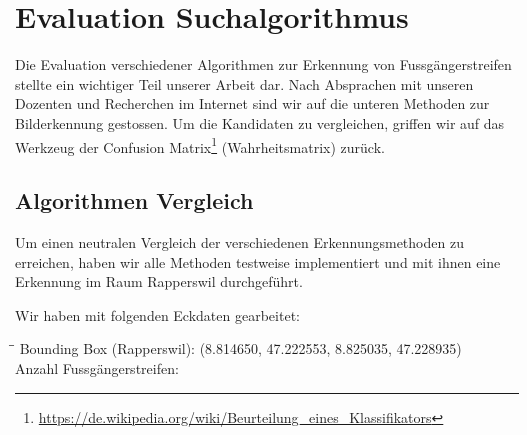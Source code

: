 \section{Evaluation Suchalgorithmus}
\label{sec:suchalgorithmus}
Die Evaluation verschiedener Algorithmen zur Erkennung von Fussgängerstreifen stellte ein wichtiger Teil unserer Arbeit dar. Nach Absprachen mit unseren Dozenten und Recherchen im Internet sind wir auf die unteren Methoden zur Bilderkennung gestossen. Um die Kandidaten zu vergleichen, griffen wir auf das Werkzeug der \Gls{Confusion Matrix}\footnote{\url{https://de.wikipedia.org/wiki/Beurteilung_eines_Klassifikators}} (Wahrheitsmatrix) zurück.

\subsection{Algorithmen Vergleich}
Um einen neutralen Vergleich der verschiedenen Erkennungsmethoden zu erreichen, haben wir alle Methoden testweise implementiert und mit ihnen eine Erkennung im Raum Rapperswil durchgeführt.

Wir haben mit folgenden Eckdaten gearbeitet:
\begin{tabbing}[H]
    \hspace*{5cm}\=\hspace*{6cm}\= \kill
    Bounding Box (Rapperswil): \> (8.814650, 47.222553, 8.825035, 47.228935) \\
    Anzahl Fussgängerstreifen:  \\
\end{tabbing}


